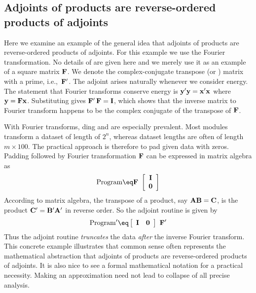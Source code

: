 \subsection{Adjoints of products are reverse-ordered products of adjoints}
Here we examine an example of the general idea that
adjoints of products are reverse-ordered products of adjoints.
For this example we use the Fourier transformation.
No details of  are given here
and we merely use it as an example of a square matrix $\bold F$.
We denote the complex-conjugate transpose (or ) matrix
with a prime,
i.e.,~$\bold F'$.
The adjoint arises naturally whenever we consider energy.
The statement that Fourier transforms conserve energy is 
$\bold y'\bold y=\bold x'\bold x$ where $\bold y= \bold F \bold x$.
Substituting gives $\bold F'\, \bold F = \bold I$, which shows that
the inverse matrix to Fourier transform
happens to be the complex conjugate of the transpose of $\bold F$.
\par
With Fourier transforms,
ding and  are especially prevalent.
Most modules transform a dataset of length of $2^n$,
whereas dataset lengths are often of length $m \times 100$.
The practical approach is therefore to pad given data with zeros.
Padding followed by Fourier transformation $\bold F$
can be expressed in matrix algebra as
\begin{equation}
{\rm Program} \eq
\bold F \ 
 \left[ 
  \begin{array}{c}
   \bold I \\ 
   \bold 0
  \end{array}
 \right] 
\end{equation}
According to matrix algebra, the transpose of a product,
say $\bold A \bold B = \bold C$,
is the product $\bold C' = \bold B' \bold A'$ in reverse order.
So the adjoint routine is given by
\begin{equation}
{\rm Program'} \eq
 \left[ 
  \begin{array}{cc}
   \bold I & \bold 0
  \end{array}
 \right] 
\
\bold F'
\end{equation}
Thus the adjoint routine
{\em  truncates} the data {\em  after} the inverse Fourier transform.
This concrete example illustrates that common sense often represents
the mathematical abstraction
that adjoints of products are reverse-ordered products of adjoints.
It is also nice to see a formal mathematical notation
for a practical necessity.
Making an approximation need not lead to collapse of all precise analysis.


